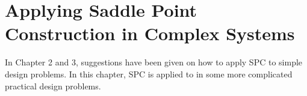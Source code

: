 \chapter{Applying Saddle Point Construction in Complex Systems} %
\label{chapter_4} %
\graphicspath{ {./chapter-4/figures/} }  %
\captionsetup[figure]{labelfont=bf}
\captionsetup{margin=1.5em}
\captionsetup[table]{labelfont=bf}

\newcommand*\circled[1]{\tikz[baseline=(char.base)]{
            \node[shape=circle,draw,inner sep=0.5pt] (char) {#1};}}







In Chapter 2 and 3, suggestions have been given on how to apply SPC to simple design problems. In this chapter, SPC is applied to in some more complicated practical design problems.


